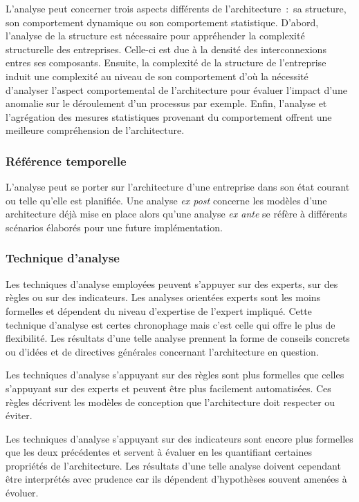 L'analyse peut concerner trois aspects différents de l'architecture~:~sa
structure, son comportement dynamique ou son comportement statistique. D'abord,
l'analyse de la structure est nécessaire pour appréhender la complexité
structurelle des entreprises. Celle-ci est due à la densité des interconnexions
entres ses composants. Ensuite, la complexité de la structure de l'entreprise
induit une complexité au niveau de son comportement d'où la nécessité
d'analyser l'aspect comportemental de l'architecture pour évaluer l'impact
d'une anomalie sur le déroulement d'un processus par exemple. Enfin, l'analyse et
l'agrégation des mesures statistiques provenant du comportement offrent une
meilleure compréhension de l'architecture.

\subsubsection{Référence temporelle}

L'analyse peut se porter sur l'architecture d'une entreprise dans son état
courant ou telle qu'elle est planifiée. Une analyse \textit{ex post} concerne
les modèles d'une architecture déjà mise en place alors qu'une analyse
\textit{ex ante} se réfère à différents scénarios élaborés pour une future
implémentation.

\subsubsection{Technique d'analyse}

Les techniques d'analyse employées peuvent s'appuyer sur des experts, sur des
règles ou sur des indicateurs. Les analyses orientées experts sont les moins
formelles et dépendent du niveau d'expertise de l'expert impliqué. Cette technique d'analyse est certes chronophage mais c'est celle qui offre le plus de flexibilité. Les résultats d'une telle analyse prennent la forme de conseils
concrets ou d'idées et de directives générales concernant l'architecture en
question.

Les techniques d'analyse s'appuyant sur des règles sont plus formelles que
celles s'appuyant sur des experts et peuvent être plus facilement automatisées.
Ces règles décrivent les modèles de conception que l'architecture doit
respecter ou éviter. 

Les techniques d'analyse s'appuyant sur des indicateurs sont encore plus
formelles que les deux précédentes et servent à évaluer en les quantifiant
certaines propriétés de l'architecture. Les résultats d'une telle analyse
doivent cependant être interprétés avec prudence car ils dépendent d'hypothèses
souvent amenées à évoluer.


